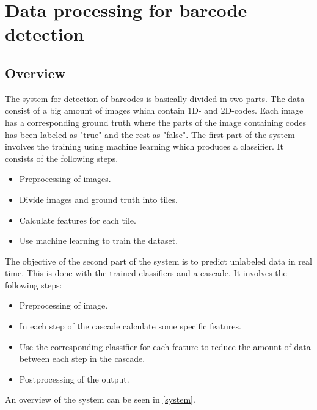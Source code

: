 \chapter{Data processing for barcode detection}
\label{sec:Data processing for barcode detection}

\section{Overview}
\label{sec:Overview}
The system for detection of barcodes is basically divided in two parts. The data consist of a big amount of images which contain 1D- and 2D-codes. Each image has a corresponding ground truth where the parts of the image containing codes has been labeled as "true" and the rest as "false". The first part of the system involves the training using machine learning which produces a classifier. It consists of the following steps.

\begin{itemize}
	\item Preprocessing of images.
	\item Divide images and ground truth into tiles.
	\item Calculate features for each tile.
	\item Use machine learning to train the dataset.
\end{itemize}

The objective of the second part of the system is to predict unlabeled data in real time. This is done with the trained classifiers and a cascade. It involves the following steps:

\begin{itemize}
	\item Preprocessing of image.
	\item In each step of the cascade calculate some specific features.
	\item Use the corresponding classifier for each feature to reduce the amount of data between each step in the cascade.
	\item Postprocessing of the output.
\end{itemize}
An overview of the system can be seen in \ref{system}.

